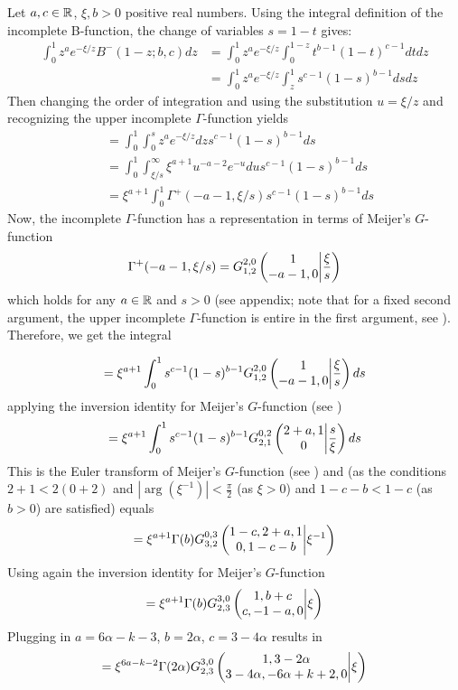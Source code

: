  
Let $a, c \in \R$, $\xi, b >0$ positive real numbers. 
Using the integral definition of the incomplete B-function, the change of variables $s=1-t$ gives:
\begin{align*}
\int_0^1 z^a e^{-\xi/z} B^-(1-z;b,c) dz &=\int_0^1 z^a e^{-\xi/z} \int_0^{1-z} t^{b-1} (1-t)^{c-1} dt dz \\
&=\int_0^1 z^a e^{-\xi/z} \int_z^1 s^{c-1} (1-s)^{b-1} ds dz
\end{align*}
Then changing the order of integration and using the substitution $u = \xi/z$  and recognizing the upper incomplete $\Gamma$-function yields
\begin{align*}
&=\int_0^1 \int_0^s z^a e^{-\xi/z} dz s^{c-1} (1-s)^{b-1} ds \\
&=\int_0^1 \int_{\xi/s}^\infty \xi^{a+1} u^{-a-2} e^{-u} du s^{c-1} (1-s)^{b-1} ds \\
&= \xi^{a+1} \int_0^1 \Gamma^+(-a-1,\xi/s) s^{c-1} (1-s)^{b-1} ds
\end{align*}
Now, the incomplete $\Gamma$-function has a representation in terms of Meijer's $G$-function $$\Gamma^+(-a-1,\xi/s) = \MeijerG{2}{0}{1}{2}{1}{-a-1,0}{\frac{\xi}{s}}$$ which holds for any $a\in \R$ and $s>0$ (see appendix; note that for a fixed second argument, the upper incomplete $\Gamma$-function is entire in the first argument, see \cite[pp. 899, 1032ff.]{Gradshteyn2007}).  Therefore, we get the integral

\begin{align*}
= \xi^{a+1} \int_0^1 s^{c-1} (1-s)^{b-1} \MeijerG{2}{0}{1}{2}{1}{-a-1,0}{\frac{\xi}{s}}ds
\end{align*}
applying the inversion identity for Meijer's $G$-function (see \cite[p. 209, 5.3.1.(9))]{Erdelyi1953})
\begin{align*}
=\xi^{a+1} \int_0^1 s^{c-1} (1-s)^{b-1} \MeijerG{0}{2}{2}{1}{2+a,1}{0}{\frac{s}{\xi}}ds
\end{align*}
This is the Euler transform of Meijer's $G$-function (see \cite[p. 214, 5.5.2.(5)]{Erdelyi1953}) and (as the conditions $2+1<2(0+2)$ and $|\arg(\xi^{-1})| < \frac{\pi}{2}$ (as $\xi>0$) and $1-c-b<1-c$ (as $b>0$)  are satisfied) equals
\begin{align*}
=\xi^{a+1} \Gamma(b) \MeijerG{0}{3}{3}{2}{1-c,2+a,1}{0,1-c-b}{\xi^{-1}}
\end{align*}
Using again the inversion identity for Meijer's $G$-function
\begin{align*}
=\xi^{a+1} \Gamma(b) \MeijerG{3}{0}{2}{3}{1,b+c}{c,-1-a,0}{\xi}
\end{align*}
Plugging in $a= 6\alpha-k-3$, $b=2\alpha$, $c=3-4\alpha$ results in
\begin{align*}
=\xi^{6a-k-2} \Gamma(2\alpha) \MeijerG{3}{0}{2}{3}{1,3-2\alpha}{3-4\alpha,-6\alpha+k+2,0}{\xi}
\end{align*}


